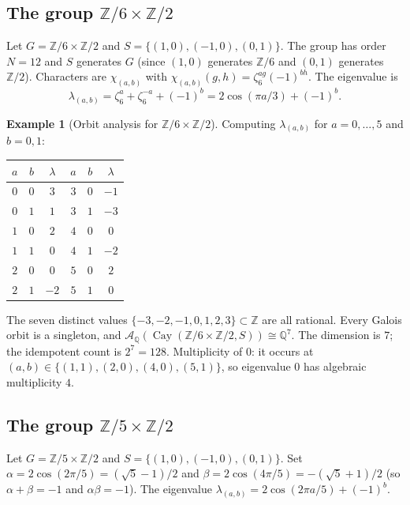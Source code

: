 \documentclass[12pt]{amsart}
\numberwithin{equation}{section}
\theoremstyle{plain}
\theoremstyle{definition}
\newtheorem{example}[theorem]{Example}
\DeclareMathOperator{\Cay}{Cay}
\newcommand{\Z}{\mathbb{Z}}
\newcommand{\Q}{\mathbb{Q}}
\newcommand{\calA}{\mathcal{A}}
\begin{document}
\subsection{The group $\Z/6 \times \Z/2$}

Let $G = \Z/6 \times \Z/2$ and $S = \{(1,0), (-1,0), (0,1)\}$.
The group has order $N = 12$ and $S$ generates $G$ (since $(1,0)$ generates
$\Z/6$ and $(0,1)$ generates $\Z/2$).  Characters are $\chi_{(a,b)}$ with
$\chi_{(a,b)}(g,h) = \zeta_6^{ag}(-1)^{bh}$.  The eigenvalue is
\[
  \lambda_{(a,b)}
  = \zeta_6^a + \zeta_6^{-a} + (-1)^b
  = 2\cos(\pi a/3) + (-1)^b.
\]

\begin{example}[Orbit analysis for $\Z/6 \times \Z/2$]
\label{ex:Z6Z2}
Computing $\lambda_{(a,b)}$ for $a = 0, \ldots, 5$ and $b = 0, 1$:
\begin{center}
\renewcommand{\arraystretch}{1.15}
\small
\begin{tabular}{cc|c|cc|c}
\toprule
$a$ & $b$ & $\lambda$ & $a$ & $b$ & $\lambda$ \\
\midrule
$0$ & $0$ & $3$  & $3$ & $0$ & $-1$ \\
$0$ & $1$ & $1$  & $3$ & $1$ & $-3$ \\
$1$ & $0$ & $2$  & $4$ & $0$ & $0$ \\
$1$ & $1$ & $0$  & $4$ & $1$ & $-2$ \\
$2$ & $0$ & $0$  & $5$ & $0$ & $2$ \\
$2$ & $1$ & $-2$ & $5$ & $1$ & $0$ \\
\bottomrule
\end{tabular}
\end{center}
The seven distinct values $\{-3, -2, -1, 0, 1, 2, 3\} \subset \Z$ are all
rational.  Every Galois orbit is a singleton, and
$\calA_\Q(\Cay(\Z/6 \times \Z/2, S)) \cong \Q^7$.
The dimension is $7$; the idempotent count is $2^7 = 128$.
Multiplicity of $0$: it occurs at $(a,b) \in \{(1,1),(2,0),(4,0),(5,1)\}$,
so eigenvalue $0$ has algebraic multiplicity $4$.
\end{example}

\subsection{The group $\Z/5 \times \Z/2$}

Let $G = \Z/5 \times \Z/2$ and $S = \{(1,0), (-1,0), (0,1)\}$.
Set $\alpha = 2\cos(2\pi/5) = (\sqrt{5}-1)/2$ and $\beta = 2\cos(4\pi/5)
= -(\sqrt{5}+1)/2$ (so $\alpha + \beta = -1$ and $\alpha\beta = -1$).
The eigenvalue $\lambda_{(a,b)} = 2\cos(2\pi a/5) + (-1)^b$.
\end{document}
